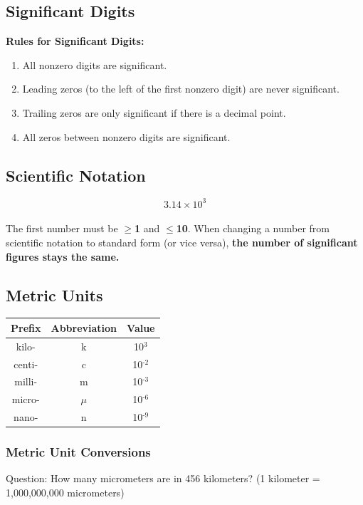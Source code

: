 \documentclass[a4paper, 12pt]{article}
\begin{document}
\subsection{Significant Digits}
\textbf{Rules for Significant Digits:}
\begin{enumerate}[leftmargin=*, nosep]
    \item All nonzero digits are significant.
    \item Leading zeros (to the left of the first nonzero digit) are never significant.
    \item Trailing zeros are only significant if there is a decimal point.
    \item All zeros between nonzero digits are significant.
\end{enumerate}

\subsection{Scientific Notation}
$$3.14 \times 10^3$$
\\
The first number must be \textbf{$\geq$1} and \textbf{$\leq$10}. When changing a number from scientific notation to standard form (or vice versa), \textbf{the number of significant figures stays the same.}

\subsection{Metric Units}
\begin{center}
\begin{tabular}{c|c|c}
   \textbf{Prefix} & \textbf{Abbreviation} & \textbf{Value} \\\hline
    kilo- & k & 10$^3$ \\
    centi- & c & 10$^{\text{-2}}$ \\
    milli- & m & 10$^{\text{-3}}$ \\
    micro- & $\mu$ & 10$^{\text{-6}}$ \\
    nano- & n & 10$^{\text{-9}}$ \\
\end{tabular}
\end{center}

\subsubsection{Metric Unit Conversions}
Question: How many micrometers are in 456 kilometers? (1 kilometer = 1,000,000,000 micrometers)
\end{document}
